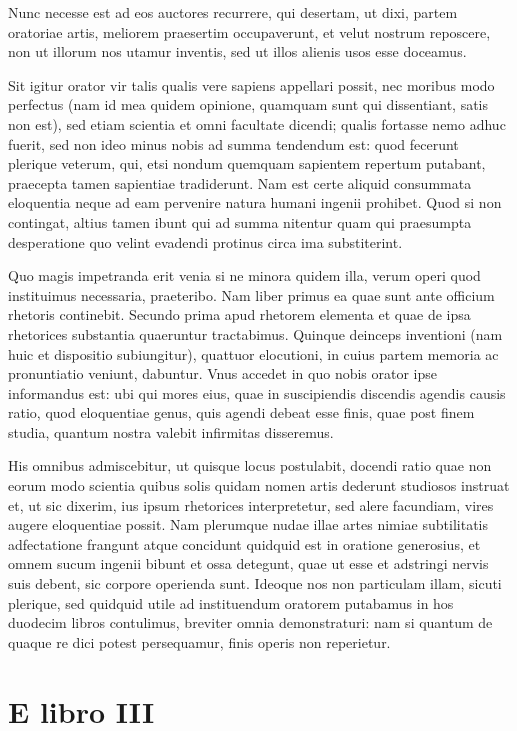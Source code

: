 Nunc necesse est ad eos auctores recurrere, qui desertam, ut dixi, partem oratoriae artis, meliorem praesertim occupaverunt, et velut nostrum reposcere, non ut illorum nos utamur inventis, sed ut illos alienis usos esse doceamus. 

Sit igitur orator vir talis qualis vere sapiens appellari possit, nec moribus modo perfectus (nam id mea quidem opinione, quamquam sunt qui dissentiant, satis non est), sed etiam scientia et omni facultate dicendi; qualis fortasse nemo adhuc fuerit, sed non ideo minus nobis ad summa tendendum est: quod fecerunt plerique veterum, qui, etsi nondum quemquam sapientem repertum putabant, praecepta tamen sapientiae tradiderunt. Nam est certe aliquid consummata eloquentia neque ad eam pervenire natura humani ingenii prohibet. Quod si non contingat, altius tamen ibunt qui ad summa nitentur quam qui praesumpta desperatione quo velint evadendi protinus circa ima substiterint. 

Quo magis impetranda erit venia si ne minora quidem illa, verum operi quod instituimus necessaria, praeteribo. Nam liber primus ea quae sunt ante officium rhetoris continebit. Secundo prima apud rhetorem elementa et quae de ipsa rhetorices substantia quaeruntur tractabimus. Quinque deinceps inventioni (nam huic et dispositio subiungitur), quattuor elocutioni, in cuius partem memoria ac pronuntiatio veniunt, dabuntur. Vnus accedet in quo nobis orator ipse informandus est: ubi qui mores eius, quae in suscipiendis discendis agendis causis ratio, quod eloquentiae genus, quis agendi debeat esse finis, quae post finem studia, quantum nostra valebit infirmitas disseremus. 

His omnibus admiscebitur, ut quisque locus postulabit, docendi ratio quae non eorum modo scientia quibus solis quidam nomen artis dederunt studiosos instruat et, ut sic dixerim, ius ipsum rhetorices interpretetur, sed alere facundiam, vires augere eloquentiae possit. Nam plerumque nudae illae artes nimiae subtilitatis adfectatione frangunt atque concidunt quidquid est in oratione generosius, et omnem sucum ingenii bibunt et ossa detegunt, quae ut esse et adstringi nervis suis debent, sic corpore operienda sunt. Ideoque nos non particulam illam, sicuti plerique, sed quidquid utile ad instituendum oratorem putabamus in hos duodecim libros contulimus, breviter omnia demonstraturi: nam si quantum de quaque re dici potest persequamur, finis operis non reperietur.

\section*{E libro III}


